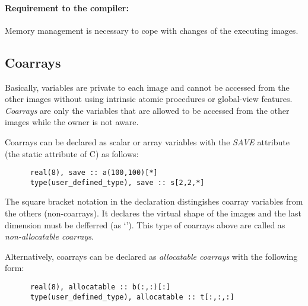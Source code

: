 
\paragraph{Requirement to the compiler:}
Memory management is necessary to cope with changes of the executing images.



\subsection{Coarrays}

Basically, variables are private to each image and cannot be accessed from 
the other images without using intrinsic atomic procedures or global-view features.
{\em Coarrays} are only the variables that are allowed to be
accessed from the other images while the owner is not aware.

Coarrays can be declared as scalar or array variables with the {\em SAVE} attribute
(the static attribute of C) as follows:

\begin{verbatim}
      real(8), save :: a(100,100)[*]
      type(user_defined_type), save :: s[2,2,*]
\end{verbatim}

The square bracket notation in the declaration distingishes coarray variables from 
the others (non-coarrays). It declares the virtual shape of the images and the last 
dimension must be defferred (as `{\em *}').
This type of coarrays above are called as {\em non-allocatable coarrays}. 

Alternatively, coarrays can be declared as {\em allocatable coarrays} with the 
following form:

\begin{verbatim}
      real(8), allocatable :: b(:,:)[:]
      type(user_defined_type), allocatable :: t[:,:,:]
\end{verbatim}

